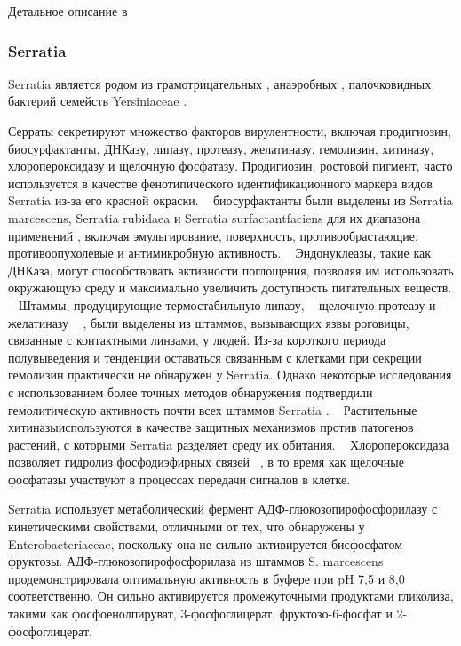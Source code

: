 \documentclass[11pt]{article}
\begin{document}
	Детальное описание в ~\cite{Mesorhizobium_1,Mesorhizobium_2,Mesorhizobium_3,Mesorhizobium_4,Mesorhizobium_5}
	
	\subsubsection{Serratia}
	Serratia является родом из грамотрицательных , анаэробных , палочковидных бактерий семейств Yersiniaceae . ~\cite{Serratia_5}
	
	Серраты секретируют множество факторов вирулентности, включая продигиозин, биосурфактанты, ДНКазу, липазу, протеазу, желатиназу, гемолизин, хитиназу, хлоропероксидазу и щелочную фосфатазу. Продигиозин, ростовой пигмент, часто используется в качестве фенотипического идентификационного маркера видов Serratia из-за его красной окраски. ~\cite{Serratia_21} биосурфактанты были выделены из Serratia marcescens, Serratia rubidaea и Serratia surfactantfaciens для их диапазона применений , включая эмульгирование, поверхность, противообрастающие, противоопухолевые и антимикробную активность. ~\cite{Serratia_22, Serratia_23} Эндонуклеазы, такие как ДНКаза, могут способствовать активности поглощения, позволяя им использовать окружающую среду и максимально увеличить доступность питательных веществ. ~\cite{Serratia_24} Штаммы, продуцирующие термостабильную липазу, ~\cite{Serratia_25} щелочную протеазу и желатиназу ~\cite{Serratia_26} , были выделены из штаммов, вызывающих язвы роговицы, связанные с контактными линзами, у людей. Из-за короткого периода полувыведения и тенденции оставаться связанным с клетками при секреции гемолизин практически не обнаружен у Serratia. Однако некоторые исследования с использованием более точных методов обнаружения подтвердили гемолитическую активность почти всех штаммов Serratia . ~\cite{Serratia_27} Растительные хитиназыиспользуются в качестве защитных механизмов против патогенов растений, с которыми Serratia разделяет среду их обитания. ~\cite{Serratia_28, Serratia_29} Хлоропероксидаза позволяет гидролиз фосфодиэфирных связей ~\cite{Serratia_30}, в то время как щелочные фосфатазы участвуют в процессах передачи сигналов в клетке.
	
	Serratia использует метаболический фермент АДФ-глюкозопирофосфорилазу с кинетическими свойствами, отличными от тех, что обнаружены у Enterobacteriaceae, поскольку она не сильно активируется бисфосфатом фруктозы. АДФ-глюкозопирофосфорилаза из штаммов S. marcescens продемонстрировала оптимальную активность в буфере при pH 7,5 и 8,0 соответственно. Он сильно активируется промежуточными продуктами гликолиза, такими как фосфоенолпируват, 3-фосфоглицерат, фруктозо-6-фосфат и 2-фосфоглицерат. ~\cite{Serratia_31}
	
\end{document}
